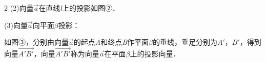 \begin{multicols}{2}
\bindp (2)向量\(\overrightarrow{a}\)在直线\emph{l}上的投影如图②．

\bindp \par\vspace{1.9mm}\noindent\makebox[\linewidth][c]{\resizebox{80.8mm}{!}{}}\par\vspace{-1.0mm}

\bindp (3)向量\(\overrightarrow{a}\)向平面\(\beta\)投影：

\bindp 如图③，分别由向量\(\overrightarrow{a}\)的起点\emph{A}和终点\emph{B}作平面\(\beta\)的垂线，垂足分别为\(A'\)，\(B'\)，得到向量\(\overrightarrow{A'B'}\)，向量\(\overrightarrow{A'B'}\)称为向量\(\overrightarrow{a}\)在平面\(\beta\)上的投影向量．\par\addvspace{0.80mm}



\end{multicols}
